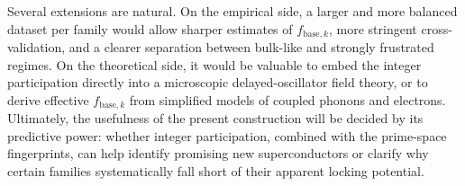 \documentclass[aps,prb,twocolumn,superscriptaddress,floatfix,nofootinbib]{revtex4-2}
\newcommand{\Fm}{\ensuremath{F_{\mathrm{m}}}}
\newcommand{\Fmstar}{\ensuremath{{F_{\mathrm{m}}^{\ast}}}}
\newcommand{\fbase}{\ensuremath{{f_{\mathrm{base}}}}}
\newcommand{\Ncorr}{\ensuremath{{N_{\mathrm{corr}}}}}
\newcommand{\deltalock}{\ensuremath{\delta}}
\newcommand{\He}{\ensuremath{\mathrm{He}}}
\newcommand{\HeFour}{\ensuremath{{^{4}\He}}}
\newcommand{\figref}[1]{Fig.~\ref{#1}}
\begin{document}
Several extensions are natural. On the empirical side, a larger and more
balanced dataset per family would allow sharper estimates of
\(f_{\mathrm{base},k}\), more stringent cross-validation, and a clearer
separation between bulk-like and strongly frustrated regimes. On the
theoretical side, it would be valuable to embed the integer participation
directly into a microscopic delayed-oscillator field theory, or to derive
effective \(f_{\mathrm{base},k}\) from simplified models of coupled phonons
and electrons. Ultimately, the usefulness of the present construction will
be decided by its predictive power: whether integer participation, combined
with the prime-space fingerprints, can help identify promising new
superconductors or clarify why certain families systematically fall short of
their apparent locking potential.
%
%
%
%
%
%
%
\end{document}
